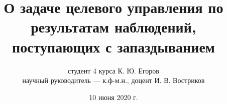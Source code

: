 
\usepackage{tikz}
\usepackage{adjustbox}

\title[Выпускная квалификационная работа]
        {О задаче целевого управления по результатам наблюдений, поступающих с запаздыванием}
\author[К. Ю. Егоров]
        {студент 4 курса К. Ю. Егоров\\
        научный руководитель --- к.ф-м.н., доцент И. В. Востриков}
\date{10 июня 2020 г.}



